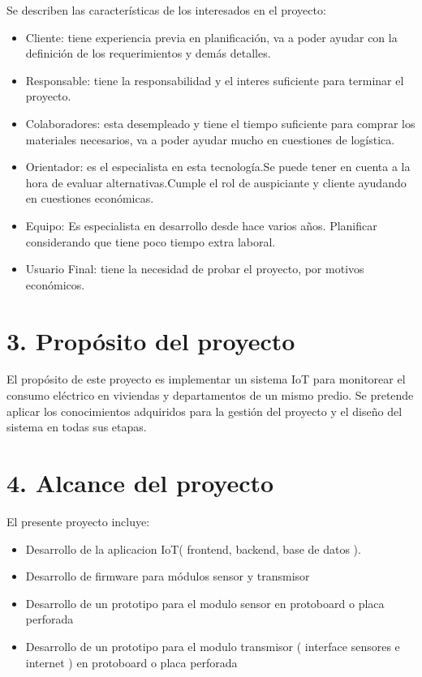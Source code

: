 \documentclass[
11pt, %
]{charter}
\begin{document}
Se describen las características de los interesados en el proyecto:

\begin{itemize}
	\item Cliente: tiene experiencia previa en planificación, va a poder ayudar con la definición de los requerimientos y demás detalles. 
	\item Responsable: tiene la responsabilidad y el interes suficiente para terminar el proyecto.
	\item Colaboradores: esta desempleado y tiene el tiempo suficiente para comprar los materiales necesarios, va a poder ayudar mucho en cuestiones de logística.
	\item Orientador: es el especialista en esta tecnología.Se puede tener en cuenta  a la hora de evaluar alternativas.Cumple el rol de auspiciante y cliente ayudando en cuestiones económicas.
	\item Equipo: Es especialista en desarrollo desde hace varios años. Planificar considerando que tiene poco tiempo extra laboral.
	\item Usuario Final: tiene la necesidad de probar el proyecto, por motivos económicos.
\end{itemize}




\section{3. Propósito del proyecto}
\label{sec:proposito}


El propósito de este proyecto es implementar un sistema IoT para monitorear el consumo eléctrico en viviendas y departamentos de un mismo predio.
Se pretende aplicar los conocimientos adquiridos para la gestión del proyecto y el diseño del sistema en todas sus etapas.


\section{4. Alcance del proyecto}
\label{sec:alcance}


El presente proyecto incluye:

\begin{itemize}
\item{Desarrollo de la aplicacion IoT( frontend, backend, base de datos ).}
\item{Desarrollo de firmware para módulos sensor y transmisor }
\item{Desarrollo de un prototipo  para el modulo sensor en protoboard o placa perforada}
\item{Desarrollo de un prototipo para el modulo transmisor ( interface sensores e internet ) en protoboard o placa perforada}
\end{itemize}
\end{document}
